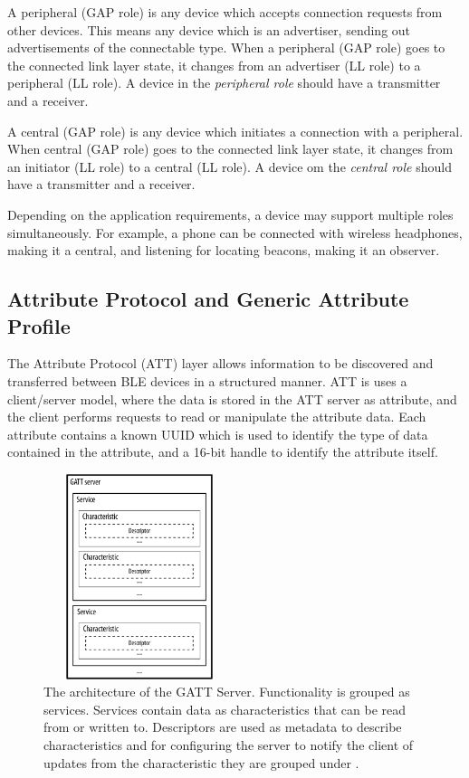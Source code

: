 A peripheral (GAP role) is any device which accepts connection requests from other devices. This means any device which is an advertiser, sending out advertisements of the connectable type. When a peripheral (GAP role) goes to the connected link layer state, it changes from an advertiser (LL role) to a peripheral (LL role). A device in the \textit{peripheral role} should have a transmitter and a receiver.

A central (GAP role) is any device which initiates a connection with a peripheral. When central (GAP role) goes to the connected link layer state, it changes from an initiator (LL role) to a central (LL role). A device om the \textit{central role} should have a transmitter and a receiver.

Depending on the application requirements, a device may support multiple roles simultaneously. For example, a phone can be connected with wireless headphones, making it a central, and listening for locating beacons, making it an observer.

\subsection{Attribute Protocol and Generic Attribute Profile}
The Attribute Protocol (ATT) layer allows information to be discovered and transferred between BLE devices in a structured manner. ATT is uses a client/server model, where the data is stored in the ATT server as attribute, and the client performs requests to read or manipulate the attribute data. Each attribute contains a known UUID which is used to identify the type of data contained in the attribute, and a 16-bit handle to identify the attribute itself. 

\begin{figure}[]
    \centering
    \includegraphics[width=0.5\textwidth,height=6cm,keepaspectratio=true]{images/gatt_service}
    \caption{
        The architecture of the GATT Server. Functionality is grouped as services. Services contain data as characteristics that can be read from or written to. Descriptors are used as metadata to describe characteristics and for configuring the server to notify the client of updates from the characteristic they are grouped under \cite{townsend_cufi}.
    }
    \label{fig:gatt_server}
\end{figure}


